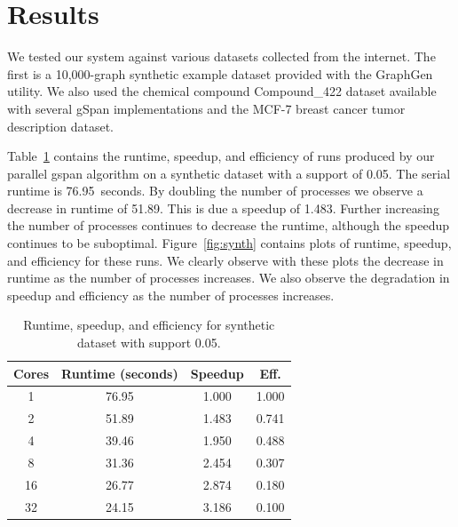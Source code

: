 \section{Results}
\label{sec:results}

We tested our system against various datasets collected from the internet.
The first is a 10,000-graph synthetic example dataset provided with the 
GraphGen utility. We also used the chemical compound Compound\_422 dataset
available with several gSpan implementations
and the MCF-7 breast cancer tumor description dataset.

Table~\ref{tab:synth} contains the runtime, speedup, and efficiency of runs
produced by our parallel gspan algorithm on a synthetic dataset with
a support of 0.05. The serial runtime is 76.95~seconds. By doubling
the number of processes we observe a decrease in runtime of 51.89. This
is due a speedup of 1.483. Further increasing the number of processes continues
to decrease the runtime, although the speedup continues to be suboptimal.
Figure~\ref{fig:synth} contains plots of runtime, speedup, and efficiency for
these runs. We clearly observe with these plots the decrease in runtime as the
number of processes increases. We also observe the degradation in speedup and
efficiency as the number of processes increases.


\begin{table}[H]
\centering
\begin{tabular}{cccc}
\hline
Cores & Runtime (seconds) & Speedup &  Eff.  \\
\hline
1    &   76.95   &  1.000 &     1.000  \\
2    &   51.89   &  1.483 &     0.741  \\
4    &   39.46   &  1.950 &     0.488  \\
8    &   31.36   &  2.454 &     0.307  \\
16   &   26.77   &  2.874 &     0.180  \\
32   &   24.15   &  3.186 &     0.100  \\
\hline
\end{tabular}
\caption{Runtime, speedup, and efficiency for synthetic dataset with support
         0.05.}
\label{tab:synth}
\end{table}

